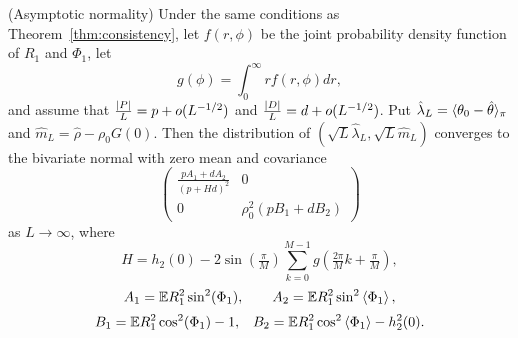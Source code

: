 \documentclass[journal]{IEEEtran}
\begin{document}
\begin{theorem}\label{thm:normality} (Asymptotic normality)
Under the same conditions as Theorem~\ref{thm:consistency}, let $f(r,\phi)$ be the joint probability density function of $R_1$ and $\Phi_1$, let
\[
g(\phi) = \int_{0}^{\infty} r f(r,\phi) dr,
\]
and assume that $\frac{{\left\vert P \right\vert}}{L} = p + o(L^{-1/2})$ and $\frac{{\left\vert D \right\vert}}{L} = d + o(L^{-1/2})$.
Put $\hat{\lambda}_L = \langle \theta_0 - \hat{\theta} \rangle_\pi$ and $\hat{m}_L = \hat{\rho} - \rho_0 G(0)$. %
Then the distribution of $(\sqrt{L}\hat{\lambda}_L, \sqrt{L}\hat{m}_L)$ converges to the bivariate normal with zero mean and covariance
\[
\left( \begin{array}{cc} 
\frac{pA_1 + dA_2}{(p + H d)^2} & 0 \\
0 & \rho_0^2(pB_1 + dB_2)
\end{array} \right)
\]
as $L \rightarrow \infty$, where
\[
H = h_2(0) -  2 \sin(\tfrac{\pi}{M}) \sum_{k = 0}^{M-1} g(\tfrac{2\pi}{M}k + \tfrac{\pi}{M}),
\]
\[
A_1 = {\mathbb E} R_1^2\sin^2(\Phi_1), \qquad A_2 = {\mathbb E} R_1^2\sin^2\left\langle \Phi_1 \right\rangle,
\]
\[
B_1 = {\mathbb E} R_1^2 \cos^2(\Phi_1) - 1, \;\;\; B_2 = {\mathbb E} R_1^2 \cos^2\left\langle \Phi_1 \right\rangle - h_2^2(0).
\]
\end{theorem}

\end{document}

